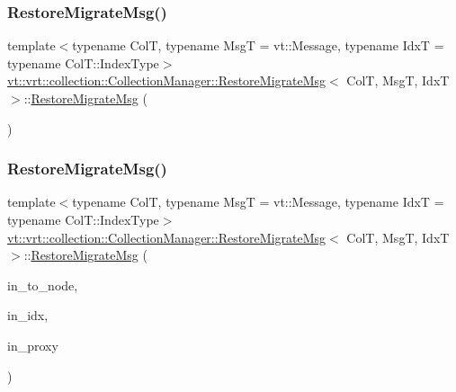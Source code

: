 \subsubsection{\texorpdfstring{Restore\+Migrate\+Msg()}{RestoreMigrateMsg()}\hspace{0.1cm}{\footnotesize\ttfamily [1/2]}}
{\footnotesize\ttfamily template$<$typename ColT, typename MsgT = vt\+::\+Message, typename IdxT = typename Col\+T\+::\+Index\+Type$>$ \\
\hyperlink{structvt_1_1vrt_1_1collection_1_1_collection_manager_1_1_restore_migrate_msg}{vt\+::vrt\+::collection\+::\+Collection\+Manager\+::\+Restore\+Migrate\+Msg}$<$ ColT, MsgT, IdxT $>$\+::\hyperlink{structvt_1_1vrt_1_1collection_1_1_collection_manager_1_1_restore_migrate_msg}{Restore\+Migrate\+Msg} (\begin{DoxyParamCaption}{ }\end{DoxyParamCaption})\hspace{0.3cm}{\ttfamily [default]}}

\mbox{\label{structvt_1_1vrt_1_1collection_1_1_collection_manager_1_1_restore_migrate_msg_af3b9150bfabb3aa3141c33d618b17f1f}} 
\subsubsection{\texorpdfstring{Restore\+Migrate\+Msg()}{RestoreMigrateMsg()}\hspace{0.1cm}{\footnotesize\ttfamily [2/2]}}
{\footnotesize\ttfamily template$<$typename ColT, typename MsgT = vt\+::\+Message, typename IdxT = typename Col\+T\+::\+Index\+Type$>$ \\
\hyperlink{structvt_1_1vrt_1_1collection_1_1_collection_manager_1_1_restore_migrate_msg}{vt\+::vrt\+::collection\+::\+Collection\+Manager\+::\+Restore\+Migrate\+Msg}$<$ ColT, MsgT, IdxT $>$\+::\hyperlink{structvt_1_1vrt_1_1collection_1_1_collection_manager_1_1_restore_migrate_msg}{Restore\+Migrate\+Msg} (\begin{DoxyParamCaption}\item[{\hyperlink{namespacevt_a866da9d0efc19c0a1ce79e9e492f47e2}{Node\+Type}}]{in\+\_\+to\+\_\+node,  }\item[{IdxT}]{in\+\_\+idx,  }\item[{\hyperlink{structvt_1_1vrt_1_1collection_1_1_collection_manager_a56458ed7f9bb22b631b9b3a745f42f94}{Collection\+Proxy\+Wrap\+Type}$<$ ColT $>$}]{in\+\_\+proxy }\end{DoxyParamCaption})\hspace{0.3cm}{\ttfamily [inline]}}



